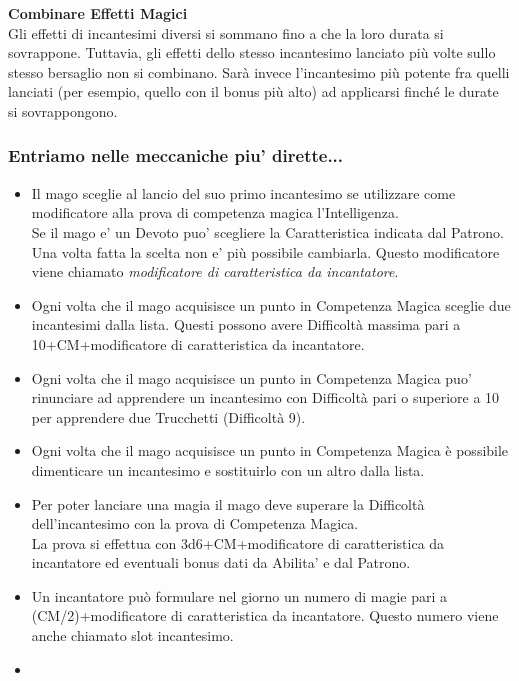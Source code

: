 \textbf{Combinare Effetti Magici}\\
Gli effetti di incantesimi diversi si sommano fino a che la loro durata si sovrappone. Tuttavia, gli effetti dello stesso incantesimo lanciato più volte sullo stesso bersaglio non si combinano. Sarà invece l'incantesimo più potente fra quelli lanciati (per esempio, quello con il bonus più alto) ad applicarsi finché le durate si sovrappongono.\\


\subsubsection{Entriamo nelle meccaniche piu' dirette...}

\begin{itemize}

\item
Il mago sceglie al lancio del suo primo incantesimo se utilizzare come modificatore alla prova di competenza magica l'Intelligenza.\\
Se il mago e' un Devoto puo' scegliere la Caratteristica indicata dal Patrono.\\
Una volta fatta la scelta non e' più possibile cambiarla. Questo modificatore viene chiamato \emph{modificatore di caratteristica da incantatore}.
\item 
Ogni volta che il mago acquisisce un punto in Competenza Magica sceglie due incantesimi dalla lista. Questi possono avere Difficoltà massima pari a 10+CM+modificatore di caratteristica da incantatore.
\item
Ogni volta che il mago acquisisce un punto in Competenza Magica puo' rinunciare ad apprendere un incantesimo con Difficoltà pari o superiore a 10 per apprendere due Trucchetti (Difficoltà 9).
\item 
Ogni volta che il mago acquisisce un punto in Competenza Magica è possibile dimenticare un incantesimo e sostituirlo con un altro dalla lista.
\item 
Per poter lanciare una magia il mago deve superare la Difficoltà dell'incantesimo con la prova di Competenza Magica.\\
La prova si effettua con 3d6+CM+modificatore di caratteristica da incantatore ed eventuali bonus dati da Abilita' e dal Patrono.
\item 
Un incantatore può formulare nel giorno un numero di magie pari a (CM/2)+modificatore di caratteristica da incantatore. Questo numero viene anche chiamato slot incantesimo.
\item

\end{itemize}
